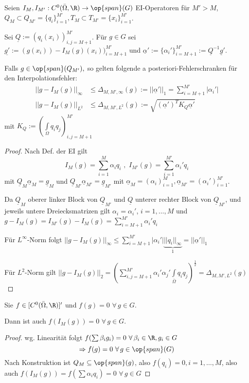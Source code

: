 \begin{satz} \label{4.5}
Seien $I_M, I_{M'}: C^0 (\bar{\Omega},\R) \rightarrow \op{span} (G)$ EI-Operatoren für $M' > M$, $Q_M \subset Q_{M'} = \{q_i\}_{i=1}^{M'}, T_M \subset T_{M'} = \{x_i\}_{i=1}^{M'}$.

Sei $\underline{Q} := (q_i(x_i))_{i,j=M+1}^{M'}$. Für $g \in G$ sei $\underline{g'} := (g(x_i)) - I_M(g)(x_i))_{i=M+1}^{M'}$ und $\underline{\alpha}' := \{\alpha_i '\}_{i=M+1}^{M'} := \underline{Q}^{-1} \underline{g}'.$

Falls $g \in \op{span}(Q_{M'}),$ so gelten folgende a posteriori-Fehlerschranken für den Interpolationsfehler:
\begin{align*}
||g-I_M(g)||_{\infty} &\leq \Delta_{M,M',\infty} (g) := ||\underline{\alpha}'||_1 = \sum\limits_{i=M+1}^{M'}|\alpha_i '| \\
||g-I_M(g)||_{L^2} &\leq \Delta_{M,M', L^2} (g) := \sqrt{(\underline{\alpha}')^T K_Q \underline{\alpha}'}
\end{align*}
mit $K_Q := (\int\limits_{\Omega} q_i q_j)_{i,j=M+1}^{M'}$
\begin{proof}
Nach Def. der EI gilt
\[
	I_M(g) = \sum\limits_{i=1}^M \alpha_i q_i \,\, , \,\, I_{M'}(g) = \sum\limits_{i=1}^{M'} \alpha_i ' q_i
\]
mit $\underline{Q}_M \underline{\alpha}_M = \underline{g}_M$ und $\underline{Q}_{M'} \underline{\alpha}_{M'} = \underline{g}_{M'}$
mit $\underline{\alpha}_M = (\alpha_i)_{i=1}^M, \underline{\alpha}_{M'} = (\alpha_i ')_{i=1}^{M'}$.

Da $\underline{Q}_M$ oberer linker Block von $\underline{Q}_{M'}$ und $\underline{Q}$ unterer rechter Block von $\underline{Q}_{M'}$, und jeweils untere Dreiecksmatrizen gilt $\alpha_i = \alpha_i '$, $i=1,\dots,M$ und $g-I_M(g) = I_{M'}(g) - I_M(g) = \sum\limits_{i=M+1}^{M'} \alpha_i ' q_i$

Für $L^{\infty}$-Norm folgt $||g-I_M(g)||_{\infty} \leq \sum\limits_{i=M+1}^{M'} | \alpha_i ' | \underbrace{||q_i||_{\infty}}_{1} = ||\underline{\alpha}'||_1$

Für $L^2$-Norm gilt $||g-I_M(g)||_{2} = \left(\sum\limits_{i,j=M+1}^{M'} \alpha_i ' \alpha_j ' \int\limits_{\bar{\Omega}} q_i q_j \right)^{\frac{1}{2}} = \Delta_{M,M',L^2}(g)$
\end{proof}
\end{satz}

\begin{satz}[Erhaltungseigenschaft]
Sie $f \in [C^0(\bar{\Omega},\R)]'$ und $f(g) = 0 \,\, \forall \, g \in G$.

Dann ist auch $f(I_M(g)) = 0 \,\, \forall \, g \in G$.
\begin{proof}
wg. Linearität folgt $f(\sum \beta_i g_i) = 0 \,\, \forall \, \beta_i \in \R, g_i \in G$
\[
	\Rightarrow f(g) = 0 \,\, \forall \, g \in \op{span}(G)
\]
Nach Konstruktion ist $Q_M \subseteq \op{span}(g)$, also $f(q_i) = 0, i=1,\dots,M$, also auch $f(I_M(g)) = f(\sum \alpha_i q_i) = 0 \,\, \forall \, g \in G$
\end{proof}
\end{satz}

